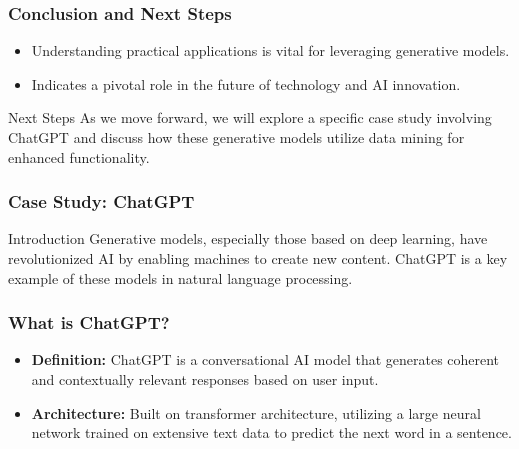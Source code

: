 \documentclass[aspectratio=169]{beamer}
\begin{document}
\begin{frame}[fragile]
    \frametitle{Conclusion and Next Steps}
    \begin{itemize}
        \item Understanding practical applications is vital for leveraging generative models.
        \item Indicates a pivotal role in the future of technology and AI innovation.
    \end{itemize}

    \begin{block}{Next Steps}
        As we move forward, we will explore a specific case study involving ChatGPT and discuss how these generative models utilize data mining for enhanced functionality.
    \end{block}
\end{frame}

\begin{frame}[fragile]
    \frametitle{Case Study: ChatGPT}
    \begin{block}{Introduction}
        Generative models, especially those based on deep learning, have revolutionized AI by enabling machines to create new content. ChatGPT is a key example of these models in natural language processing.
    \end{block}
\end{frame}

\begin{frame}[fragile]
    \frametitle{What is ChatGPT?}
    \begin{itemize}
        \item \textbf{Definition:} ChatGPT is a conversational AI model that generates coherent and contextually relevant responses based on user input.
        \item \textbf{Architecture:} Built on transformer architecture, utilizing a large neural network trained on extensive text data to predict the next word in a sentence.
    \end{itemize}
\end{frame}
\end{document}
